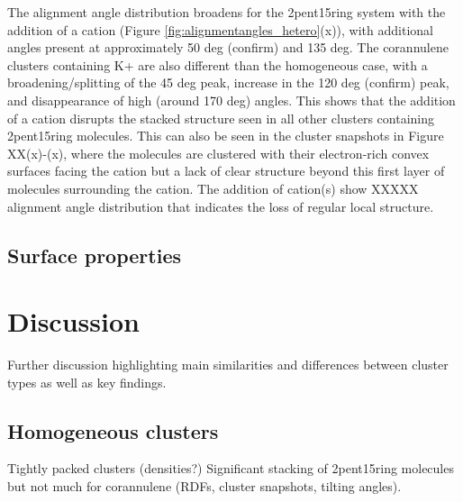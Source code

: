 The alignment angle distribution broadens for the 2pent15ring system with the addition of a cation (Figure \ref{fig:alignmentangles_hetero}(x)), with additional angles present at approximately 50 deg (confirm) and 135 deg.
The corannulene clusters containing K+ are also different than the homogeneous case, with a broadening/splitting of the 45 deg peak, increase in the 120 deg (confirm) peak, and disappearance of high (around 170 deg) angles. This shows that the addition of a cation disrupts the stacked structure seen in all other clusters containing 2pent15ring molecules. This can also be seen in the cluster snapshots in Figure XX(x)-(x), where the molecules are clustered with their electron-rich convex surfaces facing the cation but a lack of clear structure beyond this first layer of molecules surrounding the cation.
The addition of cation(s) show XXXXX alignment angle distribution that indicates the loss of regular local structure.



\subsection{Surface properties}



\section{Discussion}
Further discussion highlighting main similarities and differences between cluster types as well as key findings.

\subsection{Homogeneous clusters}
Tightly packed clusters (densities?)
Significant stacking of 2pent15ring molecules but not much for corannulene (RDFs, cluster snapshots, tilting angles).

